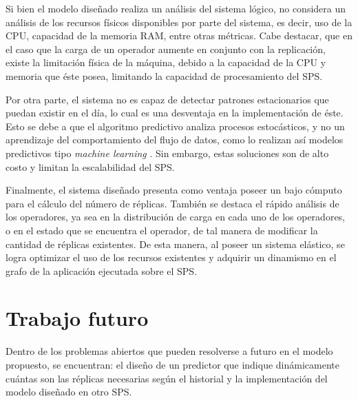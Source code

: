Si bien el modelo dise\~nado realiza un an\'alisis del sistema l\'ogico, no considera un an\'alisis de los recursos f\'isicos disponibles por parte del sistema, es decir, uso de la CPU, capacidad de la memoria RAM, entre otras m\'etricas. Cabe destacar, que en el caso que la carga de un operador aumente en conjunto con la replicaci\'on, existe la limitaci\'on f\'isica de la m\'aquina, debido a la capacidad de la CPU y memoria que \'este posea, limitando la capacidad de procesamiento del SPS.

Por otra parte, el sistema no es capaz de detectar patrones estacionarios que puedan existir en el d\'ia, lo cual es una desventaja en la implementaci\'on de \'este. Esto se debe a que el algoritmo predictivo analiza procesos estoc\'asticos, y no un aprendizaje del comportamiento del flujo de datos, como lo realizan as\'i modelos predictivos tipo \textit{machine learning} \citep{bookMohri2012}. Sin embargo, estas soluciones son de alto costo y limitan la escalabilidad del SPS.

Finalmente, el sistema dise\~nado presenta como ventaja poseer un bajo c\'omputo para el c\'alculo del n\'umero de r\'eplicas. Tambi\'en se destaca el r\'apido an\'alisis de los operadores, ya sea en la distribuci\'on de carga en cada uno de los operadores, o en el estado que se encuentra el operador, de tal manera de modificar la cantidad de r\'eplicas existentes. De esta manera, al poseer un sistema el\'astico, se logra optimizar el uso de los recursos existentes y adquirir un dinamismo en el grafo de la aplicaci\'on ejecutada sobre el SPS.

\section{Trabajo futuro}

Dentro de los problemas abiertos que pueden resolverse a futuro en el modelo propuesto, se encuentran: el dise\~no de un predictor que indique din\'amicamente cu\'antas son las r\'eplicas necesarias seg\'un el historial y la implementaci\'on del modelo dise\~nado en otro SPS.

